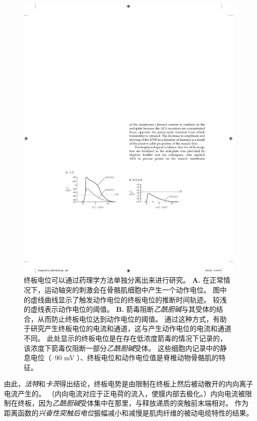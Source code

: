 \begin{figure}[htbp]
	\centering
	\includegraphics[width=1.0\linewidth]{chap12/fig_12_4}
	\caption{终板电位可以通过药理学方法单独分离出来进行研究。
		\textbf{A.} 在正常情况下，运动轴突的刺激会在骨骼肌细胞中产生一个动作电位。
		图中的虚线曲线显示了触发动作电位的终板电位的推断时间轨迹。
		较浅的虚线表示动作电位的阈值。
		\textbf{B.} 箭毒阻断\textit{乙酰胆碱}与其受体的结合，从而防止终板电位达到动作电位的阈值。
		通过这种方式，有助于研究产生终板电位的电流和通道，这与产生动作电位的电流和通道不同。
		此处显示的终板电位是在存在低浓度箭毒的情况下记录的，该浓度下箭毒仅阻断一部分\textit{乙酰胆碱}受体。
		这些细胞内记录中的静息电位（–90  mV ）、终板电位和动作电位值是脊椎动物骨骼肌的特征。}
	\label{fig:12_4}
\end{figure}


由此，\textit{法特}和\textit{卡茨}得出结论，终板电势是由限制在终板上然后被动散开的内向离子电流产生的。
（内向电流对应于正电荷的流入，使膜内部去极化。）内向电流被限制在终板，因为\textit{乙酰胆碱}受体集中在那里，与释放递质的突触前末端相对。
作为距离函数的\textit{兴奋性突触后电位}振幅减小和减慢是肌肉纤维的被动电缆特性的结果。


